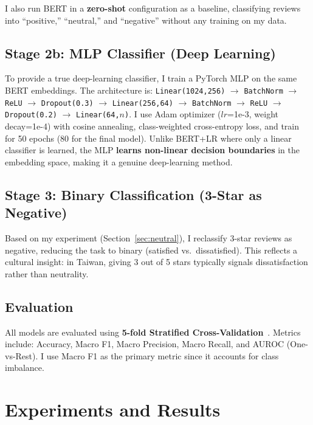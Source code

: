 \documentclass[12pt]{article}
\begin{document}
I also run BERT in a \textbf{zero-shot} configuration as a baseline, classifying reviews into ``positive,'' ``neutral,'' and ``negative'' without any training on my data.

\subsection{Stage 2b: MLP Classifier (Deep Learning)}

To provide a true deep-learning classifier, I train a PyTorch MLP on the same BERT embeddings.
The architecture is: \texttt{Linear(1024,256)} $\to$ \texttt{BatchNorm} $\to$ \texttt{ReLU} $\to$ \texttt{Dropout(0.3)} $\to$ \texttt{Linear(256,64)} $\to$ \texttt{BatchNorm} $\to$ \texttt{ReLU} $\to$ \texttt{Dropout(0.2)} $\to$ \texttt{Linear(64,$n$)}.
I use Adam optimizer ($lr$=1e-3, weight decay=1e-4) with cosine annealing, class-weighted cross-entropy loss, and train for 50 epochs (80 for the final model).
Unlike BERT+LR where only a linear classifier is learned, the MLP \textbf{learns non-linear decision boundaries} in the embedding space, making it a genuine deep-learning method.

\subsection{Stage 3: Binary Classification (3-Star as Negative)}

Based on my experiment (Section~\ref{sec:neutral}), I reclassify 3-star reviews as negative, reducing the task to binary (satisfied vs.\ dissatisfied).
This reflects a cultural insight: in Taiwan, giving 3 out of 5 stars typically signals dissatisfaction rather than neutrality.

\subsection{Evaluation}

All models are evaluated using \textbf{5-fold Stratified Cross-Validation}~\citep{scikit-learn}.
Metrics include: Accuracy, Macro F1, Macro Precision, Macro Recall, and AUROC (One-vs-Rest).
I use Macro F1 as the primary metric since it accounts for class imbalance.

\section{Experiments and Results}
\end{document}
